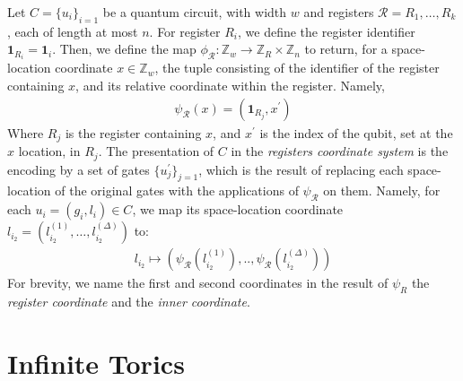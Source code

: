 \begin{definition}
  Let $C = \{u_{i}\}_{i=1}$ be a quantum circuit, with width $w$ and registers $\mathcal{R} = R_{1}, \ldots, R_{k}$, each of length at most $n$. For register $R_{i}$, we define the register identifier $\mathbf{1}_{R_{i}} = \mathbf{1}_{i}$. Then, we define the map $\phi_{\mathcal{R}} \colon \mathbb{Z}_{w} \rightarrow \mathbb{Z}_{R} \times \mathbb{Z}_{n}$ to return, for a space-location coordinate $x \in \mathbb{Z}_{w}$, the tuple consisting of the identifier of the register containing $x$, and its relative coordinate within the register. Namely,
\begin{equation*}
  \begin{split}
    \psi_{\mathcal{R}}(x) = (\mathbf{1}_{R_{j}}, x^{\prime})
  \end{split}
\end{equation*} 
Where $R_{j}$ is the register containing $x$, and $x^{\prime}$ is the index of the qubit, set at the $x$ location, in $R_{j}$.
The presentation of $C$ in the \textit{registers coordinate system} is the encoding by a set of gates $\{u^{\prime}_{j}\}_{j=1}$, which is the result of replacing each space-location of the original gates with the applications of $\psi_{\mathcal{R}}$ on them. Namely, for each $u_{i} = (g_{i}, l_{i}) \in C$, we map its space-location coordinate $l_{i_{2}} = (l_{i_{2}}^{(1)}, \ldots, l_{i_{2}}^{(\Delta)})$ to:
      \begin{equation*}
        \begin{split}
          l_{i_{2}} \mapsto ( \psi_{\mathcal{R}}(l_{i_{2}}^{(1)}), ..,\psi_{\mathcal{R}}( l_{i_{2}}^{(\Delta)}))
        \end{split}
      \end{equation*}
For brevity, we name the first and second coordinates in the result of $\psi_{R}$ the \textit{register coordinate} and the \textit{inner coordinate}.
    \end{definition}
\section{Infinite Torics}

